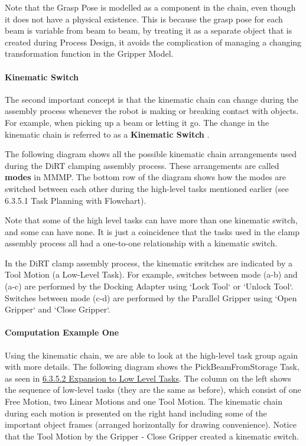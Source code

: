 Note that the Grasp Pose is modelled as a component in the chain, even though it does not have a physical existence. This is because the grasp pose for each beam is variable from beam to beam, by treating it as a separate object that is created during Process Design, it avoids the complication of managing a changing transformation function in the Gripper Model.

\paragraph{Kinematic Switch}

The second important concept is that the kinematic chain can change during the assembly process whenever the robot is making or breaking contact with objects. For example, when picking up a beam or letting it go. The change in the kinematic chain is referred to as a \textbf{Kinematic Switch} \parencite{garrettIntegratedTaskMotion2021a}. 

The following diagram shows all the possible kinematic chain arrangements used during the DiRT clamping assembly process. These arrangements are called \textbf{modes }in MMMP. The bottom row of the diagram shows how the modes are switched between each other during the high-level tasks mentioned earlier (see 6.3.5.1 Task Planning with Flowchart). 

Note that some of the high level tasks can have more than one kinematic switch, and some can have none. It is just a coincidence that the tasks used in the clamp assembly process all had a one-to-one relationship with a kinematic switch. 




In the DiRT clamp assembly process, the kinematic switches are indicated by a Tool Motion (a Low-Level Task). For example, switches between mode (a-b) and (a-c) are performed by the Docking Adapter using `Lock Tool` or `Unlock Tool`. Switches between mode (c-d) are performed by the Parallel Gripper using `Open Gripper` and `Close Gripper`.

\paragraph{Computation Example One}

Using the kinematic chain, we are able to look at the high-level task group again with more details. The following diagram shows the PickBeamFromStorage Task, as seen in \ul{6.3.5.2 Expansion to Low Level Tasks}. The column on the left shows the sequence of low-level tasks (they are the same as before), which consist of one Free Motion, two Linear Motions and one Tool Motion. The kinematic chain during each motion is presented on the right hand including some of the important object frames (arranged horizontally for drawing convenience). Notice that the Tool Motion by the Gripper - Close Gripper created a kinematic switch. 

